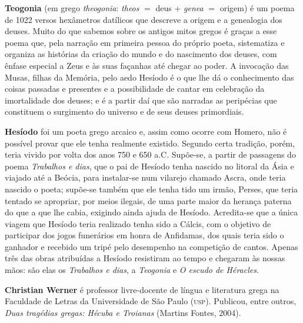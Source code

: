\textbf{Teogonia} (em grego \textit{theogonia}: \textit{theos} $=$ deus +
\textit{genea} $=$ origem) é um poema de 1022 versos hexâmetros datílicos que
descreve a origem e a genealogia dos deuses. Muito do que sabemos sobre os
antigos mitos gregos é graças a esse poema que, pela narração em primeira
pessoa do próprio poeta, sistematiza e organiza as histórias da criação do
mundo e do nascimento dos deuses, com ênfase especial a Zeus e às suas façanhas até chegar ao poder. A invocação das Musas, filhas da Memória, pelo aedo Hesíodo é o que lhe dá o conhecimento das coisas passadas e presentes e a possibilidade de cantar em celebração da imortalidade dos deuses; e é a partir daí que são narradas as peripécias que constituem o surgimento do universo e de seus deuses primordiais.  

\textbf{Hesíodo} foi um poeta grego arcaico e, assim como ocorre com Homero, não é possível provar que ele tenha realmente existido. Segundo certa tradição, porém, teria vivido por volta dos anos 750 e 650 a.C.  Supõe-se, a partir de passagens do poema \textit{Trabalhos e dias}, que o pai de Hesíodo tenha nascido no litoral da Ásia e viajado até a Beócia, para instalar-se num vilarejo chamado Ascra, onde teria nascido o poeta; supõe-se também que ele tenha tido um irmão, Perses, que teria tentado se apropriar, por meios ilegais, de uma parte maior da herança paterna do que a que lhe cabia, exigindo ainda ajuda de Hesíodo. Acredita-se que a única viagem que Hesíodo teria realizado tenha sido a Cálcis, com o objetivo de participar dos jogos funerários em honra de Anfidamas, dos quais teria sido o ganhador e recebido um tripé pelo desempenho na competição de cantos. Apenas três das obras atribuídas a Hesíodo resistiram ao tempo e chegaram às nossas mãos: são elas os \textit{Trabalhos e dias}, a \textit{Teogonia} e \textit{O escudo de Héracles}.


\textbf{Christian Werner} é professor livre-docente de língua e literatura grega na Faculdade de Letras da Universidade de São Paulo (\textsc{usp}). Publicou, entre outros, \textit{Duas tragédias gregas: Hécuba e Troianas} (Martins Fontes, 2004).



